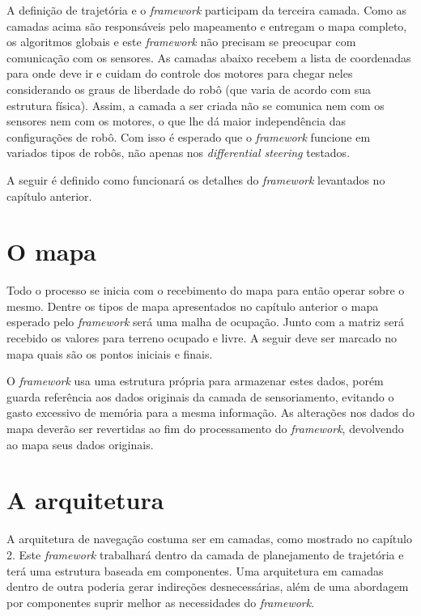 A definição de trajetória e o \textit{framework} participam da terceira camada. Como as camadas acima são responsáveis pelo mapeamento e entregam o mapa completo, os algoritmos globais e este \textit{framework} não precisam se preocupar com comunicação com os sensores. As camadas abaixo recebem a lista de coordenadas para onde deve ir e cuidam do controle dos motores para chegar neles considerando os graus de liberdade do robô (que varia de acordo com sua estrutura física). Assim, a camada a ser criada não se comunica nem com os sensores nem com os motores, o que lhe dá maior independência das configurações de robô. Com isso é esperado que o \textit{framework} funcione em variados tipos de robôs, não apenas nos \textit{differential steering} testados.

A seguir é definido como funcionará os detalhes do \textit{framework} levantados no capítulo anterior.

\section{O mapa}

Todo o processo se inicia com o recebimento do mapa para então operar sobre o mesmo. Dentre os tipos de mapa apresentados no capítulo anterior o mapa esperado pelo \textit{framework} será uma malha de ocupação. Junto com a matriz será recebido os valores para terreno ocupado e livre. A seguir deve ser marcado no mapa quais são os pontos iniciais e finais.

O \textit{framework} usa uma estrutura própria para armazenar estes dados, porém guarda referência aos dados originais da camada de sensoriamento, evitando o gasto excessivo de memória para a mesma informação. As alterações nos dados do mapa deverão ser revertidas ao fim do processamento do \textit{framework}, devolvendo ao mapa seus dados originais.

\section{A arquitetura}

A arquitetura de navegação costuma ser em camadas, como mostrado no capítulo 2. Este \textit{framework} trabalhará dentro da camada de planejamento de trajetória e terá uma estrutura baseada em componentes. Uma arquitetura em camadas dentro de outra poderia gerar indireções desnecessárias, além de uma abordagem por componentes suprir melhor as necessidades do \textit{framework}.

